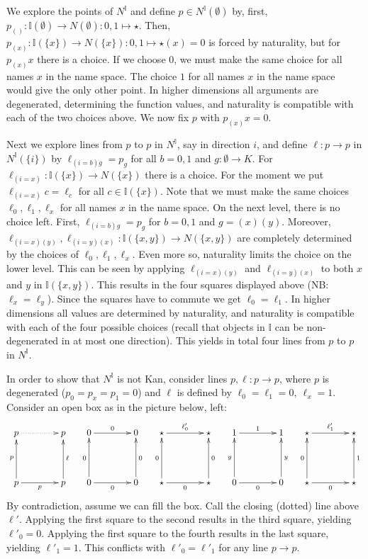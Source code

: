 \documentclass[10pt,a4paper]{article}
\newcommand{\set}[1]{\{#1\}}
\newcommand{\es}{\emptyset}
\newcommand{\interval}{\mathbb{I}}
\begin{document}
We explore the points of $N^\interval$ and define $p\in
N^\interval(\emptyset)$ by, first, $p_{()}:\interval(\emptyset)\to
N(\emptyset): 0,1 \mapsto\star$.  Then, $p_{(x)}:\interval(\set{x})\to
N(\set{x}): 0,1 \mapsto\star(x)=0$ is forced by naturality, but for
$p_{(x)} x$ there is a choice. If we choose $0$, we must make the same
choice for all names $x$ in the name space.  The choice $1$ for all
names $x$ in the name space would give the only other point. In higher
dimensions all arguments are degenerated, determining the function
values, and naturality is compatible with each of the two choices
above. We now fix $p$ with $p_{(x)} x = 0$.

Next we explore lines from $p$ to $p$ in $N^\interval$, say in
direction $i$, and define $\ell:p\to p$ in $N^\interval(\set{i})$ by
$\ell_{(i=b)g} = p_g$ for all $b=0,1$ and $g:\es\to K$.  For
$\ell_{(i=x)}: \interval(\set{x})\to N(\set{x})$ there is a choice. For
the moment we put $\ell_{(i=x)} c = \ell_c$ for all $c\in
\interval(\set{x})$. Note that we must make the same choices
$\ell_0,\ell_1,\ell_x$ for all names $x$ in the name space.  
On the next level, there is no choice left.
First, $\ell_{(i=b)g} = p_g$ for $b=0,1$ and $g=(x)(y)$. 
Moreover,
$\ell_{(i=x)(y)},\ell_{(i=y)(x)}: \interval(\set{x,y})\to N(\set{x,y})$
are completely determined by the choices of $\ell_0,\ell_1,\ell_x$.
Even more so, naturality limits the choice on the lower level.
This can be seen by applying $\ell_{(i=x)(y)}$ and $\ell_{(i=y)(x)}$
to both $x$ and $y$ in $\interval(\set{x,y})$. This results
in the four squares displayed above (NB: $\ell_x=\ell_y$).
Since the squares have to commute we get $\ell_0 = \ell_1$.  
In higher dimensions all values are
determined by naturality, and naturality is compatible with each of the
four possible choices (recall that objects in $\interval$ can be
non-degenerated in at most one direction).  This yields in total four
lines from $p$ to $p$ in $N^\interval$.

In order to show that $N^\interval$ is not Kan, consider lines
$p,\ell: p\to p$, where $p$ is degenerated ($p_0=p_x=p_1=0$) and
$\ell$ is defined by $\ell_0=\ell_1=0,~\ell_x=1$.  Consider an open
box as in the picture below, left:
\[
\xymatrix@R=.6cm@C=.6cm{
p\ar@{.>}[rr]&      & p   &  0\ar[rr]^{0}&      & 0  &  \star\ar[rr]^{\ell'_0}&      & \star
&  1\ar[rr]^{1}&      & 1 &  \star\ar[rr]^{\ell'_1}&      & \star \\
                    &&    &        &&    &    &&       &        &&    &    &&       \\
p\ar[rr]_{p}\ar[uu]^{p}& & p\ar[uu]_{\ell} &
0\ar[rr]_{0}\ar[uu]^{0}& & 0\ar[uu]_{0}    &
\star\ar[rr]_{0}\ar[uu]^{0}& & \star\ar[uu]_{0}  &
0\ar[rr]_{0}\ar[uu]^{y}& & 0\ar[uu]_{y}    &
\star\ar[rr]_{0}\ar[uu]^{0}& & \star\ar[uu]_{1}     \\
}
\]
By contradiction, assume we can fill the box.  Call the closing
(dotted) line above $\ell'$.  Applying the first square to the second
results in the third square, yielding $\ell'_0 = 0$.  Applying the
first square to the fourth results in the last square, yielding
$\ell'_1 = 1$.  This conflicts with $\ell'_0 = \ell'_1$ for any line
$p\to p$.
\end{document}
